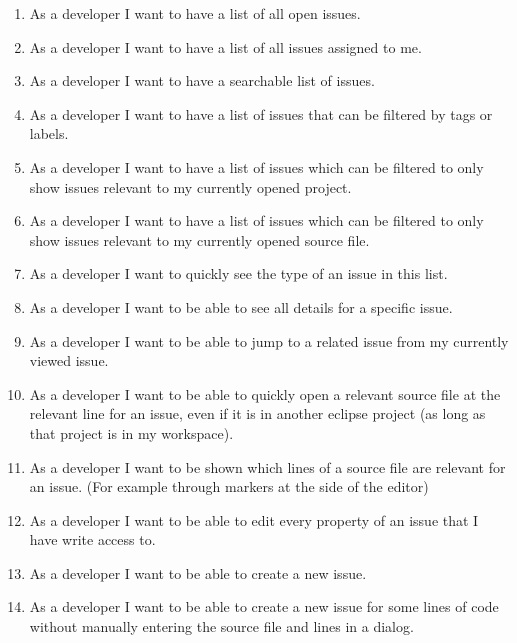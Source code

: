 \begin{enumerate}
	\item As a developer I want to have a list of all open issues. \label{itm:ch3:req:filter_open}
	\item As a developer I want to have a list of all issues assigned to me. \label{itm:ch3:req:filter_me}
	\item As a developer I want to have a searchable list of issues. \label{itm:ch3:req:filter_search}
	\item As a developer I want to have a list of issues that can be filtered by tags or labels. \label{itm:ch3:req:filter_labels}
	\item As a developer I want to have a list of issues which can be filtered to only show issues relevant to my currently opened project. \label{itm:ch3:req:filter_open project}
	\item As a developer I want to have a list of issues which can be filtered to only show issues relevant to my currently opened source file. \label{itm:ch3:req:filter_open_file}
	\item As a developer I want to quickly see the type of an issue in this list. \label{itm:ch3:req:list_issue_type}
	\item As a developer I want to be able to see all details for a specific issue.
	\item As a developer I want to be able to jump to a related issue from my currently viewed issue.
	\item As a developer I want to be able to quickly open a relevant source file at the relevant line for an issue, even if it is in another eclipse project (as long as that project is in my workspace).
	\item As a developer I want to be shown which lines of a source file are relevant for an issue. (For example through markers at the side of the editor) \label{itm:ch3:req:source_file_marker}
	\item As a developer I want to be able to edit every property of an issue that I have write access to.
	\item As a developer I want to be able to create a new issue.
	\item As a developer I want to be able to create a new issue for some lines of code without manually entering the source file and lines in a dialog.
	\setcounter{enumarteCounter}{\value{enumi}} %
\end{enumerate}

